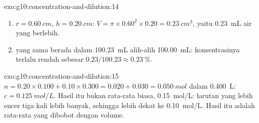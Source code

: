 \begin{solution}{exo:g10:concentration-and-dilution:14}
\begin{enumerate}
  \item $r = \qty{0.60}{cm}$, $h = \qty{0.20}{cm}$:
        $V = \pi \times 0.60^2 \times 0.20 = \qty{0.23}{cm^3}$, yaitu
        \qty{0.23}{mL} air yang berlebih.
  \item {} yang sama berada dalam \qty{100.23}{mL} alih-alih
        \qty{100.00}{mL}: konsentrasinya terlalu rendah sebesar
        $0.23 / 100.23 \approx
        \qty{0.23}{\percent}$.
\end{enumerate}
\end{solution}

\begin{solution}{exo:g10:concentration-and-dilution:15}
$n = 0.20 \times 0.100 + 0.10 \times 0.300 = 0.020 + 0.030 =
\qty{0.050}{mol}$ dalam \qty{0.400}{L}: $c = \qty{0.125}{mol/L}$. Hasil
itu bukan rata-rata biasa, \qty{0.15}{mol/L}: larutan yang lebih encer
tiga kali lebih banyak, sehingga  lebih dekat ke
\qty{0.10}{mol/L}. Hasil itu adalah rata-rata yang dibobot dengan
volume.
\end{solution}

